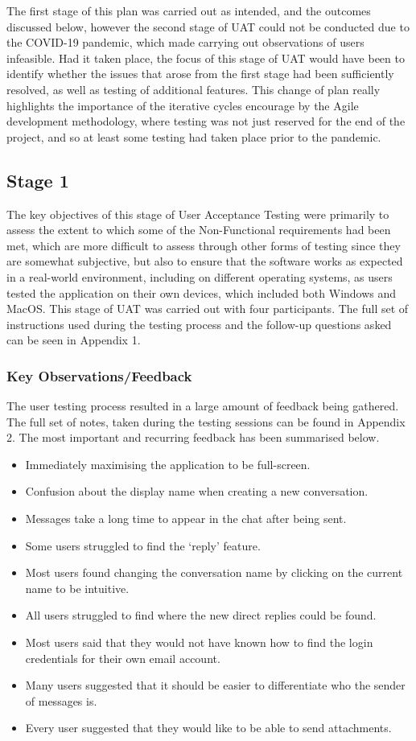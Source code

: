 The first stage of this plan was carried out as intended, and the outcomes discussed below, however the second stage of UAT could not be conducted due to the COVID-19 pandemic, which made carrying out observations of users infeasible. Had it taken place, the focus of this stage of UAT would have been to identify whether the issues that arose from the first stage had been sufficiently resolved, as well as testing of additional features. This change of plan really highlights the importance of the iterative cycles encourage by the Agile development methodology, where testing was not just reserved for the end of the project, and so at least some testing had taken place prior to the pandemic.

\subsection{Stage 1}\label{sec:stage1-uat}
The key objectives of this stage of User Acceptance Testing were primarily to assess the extent to which some of the Non-Functional requirements had been met, which are more difficult to assess through other forms of testing since they are somewhat subjective, but also to ensure that the software works as expected in a real-world environment, including on different operating systems, as users tested the application on their own devices, which included both Windows and MacOS. This stage of UAT was carried out with four participants. The full set of instructions used during the testing process and the follow-up questions asked can be seen in Appendix 1.

\subsubsection{Key Observations/Feedback}
The user testing process resulted in a large amount of feedback being gathered. The full set of notes, taken during the testing sessions can be found in Appendix 2. The most important and recurring feedback has been summarised below.

\begin{itemize}
  \item Immediately maximising the application to be full-screen.
  \item Confusion about the display name when creating a new conversation.
  \item Messages take a long time to appear in the chat after being sent.
  \item Some users struggled to find the `reply' feature.
  \item Most users found changing the conversation name by clicking on the current name to be intuitive.
  \item All users struggled to find where the new direct replies could be found.
  \item Most users said that they would not have known how to find the login credentials for their own email account.
  \item Many users suggested that it should be easier to differentiate who the sender of messages is.
  \item Every user suggested that they would like to be able to send attachments.
\end{itemize}


